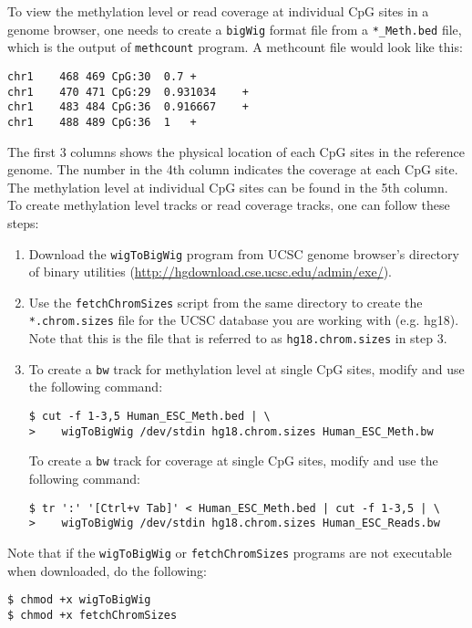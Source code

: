 \documentclass[10pt]{article}
\newcommand{\prog}[1]{\texttt{#1}}
\newcommand{\fn}[1]{\texttt{#1}}
\newcommand{\lit}[1]{\texttt{#1}}
\begin{document}
To view the methylation level or read coverage at individual CpG sites
in a genome browser, one needs to create a \lit{bigWig} format file
from a \fn{*\_Meth.bed} file, which is the output of \prog{methcount}
program. A methcount file would look like this:
\begin{verbatim}
chr1	468	469	CpG:30	0.7	+
chr1	470	471	CpG:29	0.931034	+
chr1	483	484	CpG:36	0.916667	+
chr1	488	489	CpG:36	1	+
\end{verbatim}
The first 3 columns shows the physical location of each CpG sites in
the reference genome. The number in the 4th column indicates the
coverage at each CpG site. The methylation level at individual CpG
sites can be found in the 5th column. To create methylation level
tracks or read coverage tracks, one can follow these steps:
\begin{enumerate}
\item Download the \prog{wigToBigWig} program from UCSC genome
  browser's directory of binary utilities
  (\url{http://hgdownload.cse.ucsc.edu/admin/exe/}).
\item Use the \fn{fetchChromSizes} script from the same directory to
  create the \fn{*.chrom.sizes} file for the UCSC database you are
  working with (e.g. hg18). Note that this is the file that is
  referred to as \fn{hg18.chrom.sizes} in step 3.
\item To create a \fn{bw} track for methylation level at single CpG
  sites, modify and use the following command:
\begin{verbatim}
$ cut -f 1-3,5 Human_ESC_Meth.bed | \
>    wigToBigWig /dev/stdin hg18.chrom.sizes Human_ESC_Meth.bw
\end{verbatim}
  To create a \fn{bw} track for coverage at single CpG sites, modify
  and use the following command:
\begin{verbatim}
$ tr ':' '[Ctrl+v Tab]' < Human_ESC_Meth.bed | cut -f 1-3,5 | \
>    wigToBigWig /dev/stdin hg18.chrom.sizes Human_ESC_Reads.bw
\end{verbatim}
\end{enumerate}
Note that if the \prog{wigToBigWig} or \prog{fetchChromSizes} programs
are not executable when downloaded, do the following:
\begin{verbatim}
$ chmod +x wigToBigWig
$ chmod +x fetchChromSizes
\end{verbatim}
\end{document}
